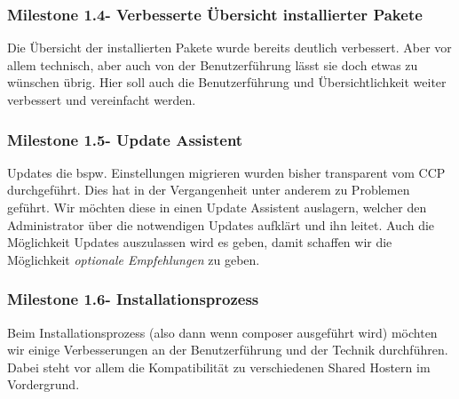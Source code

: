 \documentclass[
paper=a4,
draft=false,%
fontsize=10pt%
]{scrartcl}
\begin{document}
\pagebreak

\subsubsection[Milestone 1.4 - Verbesserte Übersicht installierter Pakete]{Milestone 1.4\footnotemark - Verbesserte Übersicht installierter Pakete}
\label{subsec:ccc-milestone-1.4}

Die Übersicht der installierten Pakete wurde bereits deutlich verbessert. Aber vor allem technisch, aber auch von der Benutzerführung lässt sie doch etwas zu wünschen übrig. Hier soll auch die Benutzerführung und Übersichtlichkeit weiter verbessert und vereinfacht werden.

\subsubsection[Milestone 1.5 - Update Assistent]{Milestone 1.5\footnotemark - Update Assistent}
\label{subsec:ccc-milestone-1.5}

Updates die bspw. Einstellungen migrieren wurden bisher transparent vom CCP durchgeführt. Dies hat in der Vergangenheit unter anderem zu Problemen geführt. Wir möchten diese in einen Update Assistent auslagern, welcher den Administrator über die notwendigen Updates aufklärt und ihn leitet. Auch die Möglichkeit Updates auszulassen wird es geben, damit schaffen wir die Möglichkeit \textit{optionale Empfehlungen} zu geben.

\subsubsection[Milestone 1.6 - Installationsprozess]{Milestone 1.6\footnotemark - Installationsprozess}
\label{subsec:ccc-milestone-1.6}

Beim Installationsprozess (also dann wenn composer ausgeführt wird) möchten wir einige Verbesserungen an der Benutzerführung und der Technik durchführen. Dabei steht vor allem die Kompatibilität zu verschiedenen Shared Hostern im Vordergrund.
\end{document}
